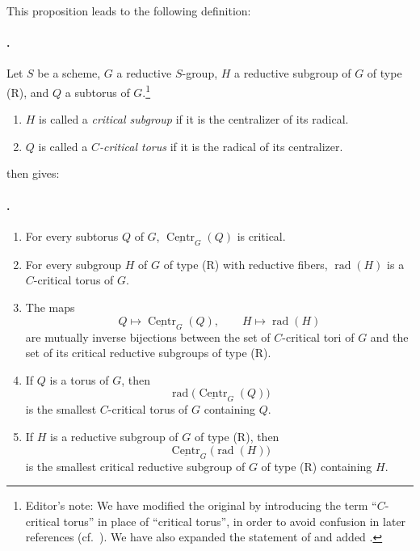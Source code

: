 This proposition leads to the following definition:

\paragraph{.}
Let \(S\) be a scheme, \(G\) a reductive \(S\)-group, \(H\) a
reductive subgroup of \(G\) of type \textup{(R)}, and \(Q\) a
subtorus of \(G\).\footnote{Editor's note: We have modified the
original by introducing the term ``\(C\)-critical torus'' in place
of ``critical torus'', in order to avoid confusion in later
references \textup{(cf.\ )}. We have also expanded
the statement of  and added .}
\begin{enumerate}
\item[\textup{1)}] \(H\) is called a \emph{critical subgroup} if it
is the centralizer of its radical.
\item[\textup{2)}] \(Q\) is called a \emph{\(C\)-critical torus} if
it is the radical of its centralizer.
\end{enumerate}

 then gives:

\paragraph{.}
\begin{enumerate}
\item[\textup{(i)}] For every subtorus \(Q\) of \(G\),
\(\underline{\operatorname{Centr}}_G(Q)\) is critical.

\item[\textup{(ii)}] For every subgroup \(H\) of \(G\) of type
\textup{(R)} with reductive fibers, \(\operatorname{rad}(H)\) is a
\(C\)-critical torus of \(G\).

\item[\textup{(iii)}] The maps
\[
  Q\longmapsto\underline{\operatorname{Centr}}_G(Q),
  \qquad
  H\longmapsto\operatorname{rad}(H)
\]
are mutually inverse bijections between the set of \(C\)-critical
tori of \(G\) and the set of its critical reductive subgroups of
type \textup{(R)}.

\item[\textup{(iv)}] If \(Q\) is a torus of \(G\), then
\[
  \operatorname{rad}\bigl(
    \underline{\operatorname{Centr}}_G(Q)\bigr)
\]
is the smallest \(C\)-critical torus of \(G\) containing \(Q\).

\item[\textup{(v)}] If \(H\) is a reductive subgroup of \(G\) of
type \textup{(R)}, then
\[
  \underline{\operatorname{Centr}}_G\bigl(\operatorname{rad}(H)\bigr)
\]
is the smallest critical reductive subgroup of \(G\) of type
\textup{(R)} containing \(H\).
\end{enumerate}

